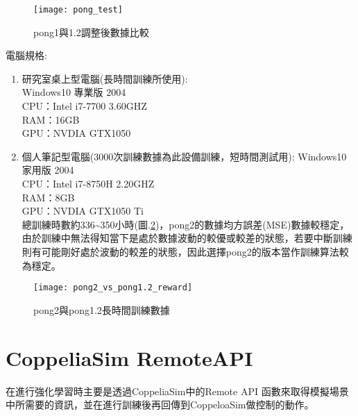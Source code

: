 \begin{figure}[hbt!]
\begin{center}
\texttt{[image: pong\_test]}
\caption{\Large pong1與1.2調整後數據比較}
\label{fig.調整後數據比較}
\end{center}
\end{figure}

\begin{flushleft}
電腦規格:\\
\end{flushleft}
\begin{enumerate}[1.]
\item 研究室桌上型電腦(長時間訓練所使用):\\
Windows10 專業版 2004\\
CPU：Intel i7-7700 3.60GHZ\\
RAM：16GB\\
GPU：NVDIA GTX1050
\item 個人筆記型電腦(3000次訓練數據為此設備訓練，短時間測試用):
Windows10 家用版 2004\\
CPU：Intel i7-8750H 2.20GHZ\\
RAM：8GB\\
GPU：NVDIA GTX1050 Ti\\

總訓練時數約336\textasciitilde 350小時(圖.\ref{fig.pong2與pong1.2長時間訓練比較})，pong2的數據均方誤差(MSE)數據較穩定，由於訓練中無法得知當下是處於數據波動的較優或較差的狀態，若要中斷訓練則有可能剛好處於波動的較差的狀態，因此選擇pong2的版本當作訓練算法較為穩定。
\end{enumerate}
\begin{figure}[hbt!]
\begin{center}
\texttt{[image: pong2\_vs\_pong1.2\_reward]}
\caption{\Large pong2與pong1.2長時間訓練數據}
\label{fig.pong2與pong1.2長時間訓練比較}
\end{center}
\end{figure}



\section{CoppeliaSim RemoteAPI}
在進行強化學習時主要是透過CoppeliaSim中的Remote API 函數來取得模擬場景中所需要的資訊，並在進行訓練後再回傳到CoppeloaSim做控制的動作。\\
